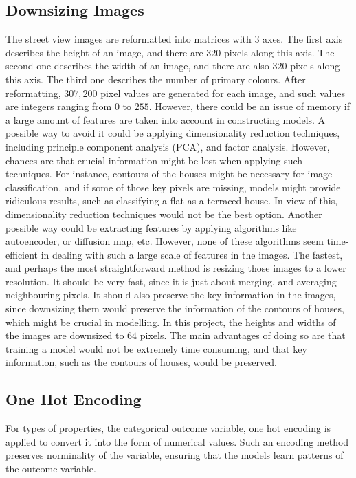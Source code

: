 \documentclass[11pt,twoside]{article}
\numberwithin{Theorem}{section}
\numberwithin{Definition}{section}
\numberwithin{Lemma}{section}
\numberwithin{Algorithm}{section}
\numberwithin{equation}{section}
\begin{document}
\subsection{Downsizing Images}
The street view images are reformatted into matrices with $3$ axes. The first axis describes the height of an image, and there are $320$ pixels along this axis. The second one describes the width of an image, and there are also $320$ pixels along this axis. The third one describes the number of primary colours. After reformatting, $307, 200$ pixel values are generated for each image, and such values are integers ranging from $0$ to $255$. However, there could be an issue of memory if a large amount of features are taken into account in constructing models. A possible way to avoid it could be applying dimensionality reduction techniques, including principle component analysis (PCA), and factor analysis. However, chances are that crucial information might be lost when applying such techniques. For instance, contours of the houses might be necessary for image classification, and if some of those key pixels are missing, models might provide ridiculous results, such as classifying a flat as a terraced house. In view of this, dimensionality reduction techniques would not be the best option. Another possible way could be extracting features by applying algorithms like autoencoder, or diffusion map, etc. However, none of these algorithms seem time-efficient in dealing with such a large scale of features in the images. The fastest, and perhaps the most straightforward method is resizing those images to a lower resolution. It should be very fast, since it is just about merging, and averaging neighbouring pixels. It should also preserve the key information in the images, since downsizing them would preserve the information of the contours of houses, which might be crucial in modelling. In this project, the heights and widths of the images are downsized to $64$ pixels. The main advantages of doing so are that training a model would not be extremely time consuming, and that key information, such as the contours of houses, would be preserved.

\subsection{One Hot Encoding}
For types of properties, the categorical outcome variable, one hot encoding is applied to convert it into the form of numerical values. Such an encoding method preserves norminality of the variable, ensuring that the models learn patterns of the outcome variable.
\end{document}

